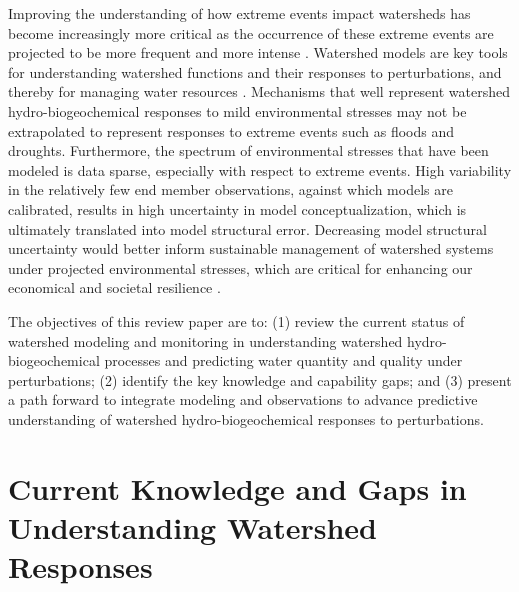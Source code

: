 \documentclass[preprint,review, 12pt]{elsarticle}
\providecommand{\DIFdelend}{} %
\DeclareRobustCommand{\DIFdelend}{\DIFOaddend \let\includegraphics\DIFOincludegraphics} %
\begin{document}
\DIFdelend Improving the understanding of how extreme events impact watersheds has become increasingly more critical as the occurrence of these extreme events are projected to be more frequent and more intense \citep{IPCC2012}. Watershed models are key tools for understanding watershed functions and their responses to perturbations, and thereby for managing water resources \citep{Weiler2004, Burt2005, Beven1997, Jones1993}. Mechanisms that well represent watershed hydro-biogeochemical responses to mild environmental stresses may not be extrapolated to represent responses to extreme events such as floods and droughts. Furthermore, the spectrum of environmental stresses that have been modeled is data sparse, especially with respect to extreme events. High variability in the relatively few end member observations, against which models are calibrated, results in high uncertainty in model conceptualization, which is ultimately translated into model structural error. Decreasing model structural uncertainty would better inform sustainable management of watershed systems under projected environmental stresses, which are critical for enhancing our economical and societal resilience \citep{Srinivasan2017, McDonnell2018b}.


The objectives of this review paper are to: (1) review the current status of watershed modeling and monitoring in understanding watershed hydro-biogeochemical processes and predicting water quantity and quality under perturbations; (2) identify the key knowledge and capability gaps; and (3) present a path forward to integrate modeling and observations to advance predictive understanding of watershed hydro-biogeochemical responses to perturbations.


\section{Current Knowledge and Gaps in Understanding Watershed Responses}
\end{document}
